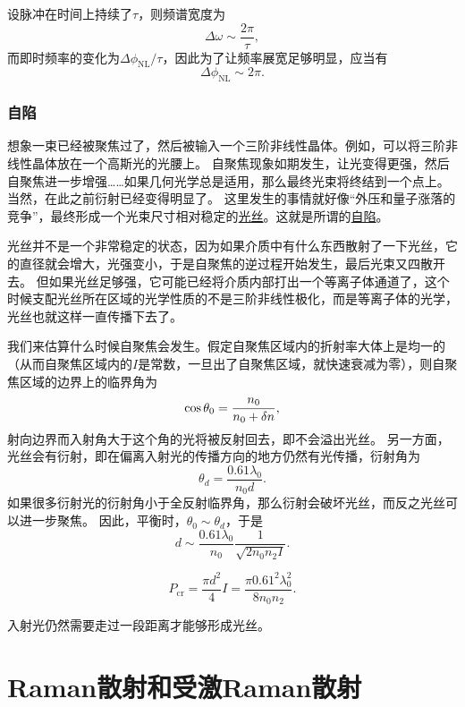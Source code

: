 \documentclass[UTF8, a4paper]{ctexart}
\newcommand{\concept}[1]{\underline{#1}}
\begin{document}
设脉冲在时间上持续了$\tau$，则频谱宽度为
\[
    \Delta \omega \sim \frac{2\pi}{\tau},
\]
而即时频率的变化为$\Delta \phi_\text{NL} / \tau$，因此为了让频率展宽足够明显，应当有
\begin{equation}
    \Delta \phi_\text{NL} \sim 2\pi.
\end{equation}

\subsubsection{自陷}

想象一束已经被聚焦过了，然后被输入一个三阶非线性晶体。例如，可以将三阶非线性晶体放在一个高斯光的光腰上。
自聚焦现象如期发生，让光变得更强，然后自聚焦进一步增强……如果几何光学总是适用，那么最终光束将终结到一个点上。
当然，在此之前衍射已经变得明显了。
这里发生的事情就好像“外压和量子涨落的竞争”，最终形成一个光束尺寸相对稳定的\concept{光丝}。这就是所谓的\concept{自陷}。

光丝并不是一个非常稳定的状态，因为如果介质中有什么东西散射了一下光丝，它的直径就会增大，光强变小，于是自聚焦的逆过程开始发生，最后光束又四散开去。
但如果光丝足够强，它可能已经将介质内部打出一个等离子体通道了，这个时候支配光丝所在区域的光学性质的不是三阶非线性极化，而是等离子体的光学，光丝也就这样一直传播下去了。

我们来估算什么时候自聚焦会发生。假定自聚焦区域内的折射率大体上是均一的（从而自聚焦区域内的$I$是常数，一旦出了自聚焦区域，就快速衰减为零），则自聚焦区域的边界上的临界角为
\[
    \cos \theta_0 = \frac{n_0}{n_0 + \var{n}},
\]
射向边界而入射角大于这个角的光将被反射回去，即不会溢出光丝。
另一方面，光丝会有衍射，即在偏离入射光的传播方向的地方仍然有光传播，衍射角为
\[
    \theta_d = \frac{0.61 \lambda_0}{n_0 d}.
\]
如果很多衍射光的衍射角小于全反射临界角，那么衍射会破坏光丝，而反之光丝可以进一步聚焦。
因此，平衡时，$\theta_0 \sim \theta_d$，于是
\begin{equation}
    d \sim \frac{0.61 \lambda_0}{n_0} \frac{1}{\sqrt{2 n_0 n_2 I}}.
\end{equation}

\begin{equation}
    P_\text{cr} = \frac{\pi d^2}{4} I = \frac{\pi 0.61^2 \lambda_0^2}{8 n_0 n_2}.
\end{equation}

入射光仍然需要走过一段距离才能够形成光丝。

\section{Raman散射和受激Raman散射}
\end{document}
